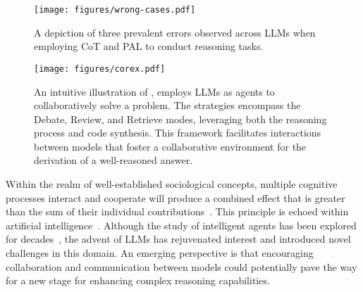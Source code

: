 \begin{figure*}[t]
  \centering
  \vspace{-0.5em}
  \texttt{[image: figures/wrong-cases.pdf]}
  \caption{A depiction of three prevalent errors observed across LLMs when employing CoT and PAL to conduct reasoning tasks.}
  \label{fig:wrong-cases}
  \vspace{-1.45em}
\end{figure*}
\begin{figure*}[t]
  \centering
  \texttt{[image: figures/corex.pdf]}
  \caption{An intuitive illustration of \ours,
  employs LLMs as agents to collaboratively solve a problem.
  The strategies encompass the Debate, Review, and Retrieve modes,
  leveraging both the reasoning process and code synthesis.
  This framework facilitates interactions between models that 
  foster a collaborative environment for the derivation of a well-reasoned answer.}
  \label{fig:method-overview}
  \vspace{-1.35em}
\end{figure*}




Within the realm of well-established sociological concepts,
multiple cognitive processes interact and cooperate will produce a combined effect that is greater than the sum of their individual contributions~\citep{luppi2022synergistic}.
This principle is echoed within artificial intelligence~\citep{li2023camel}.
Although the study of intelligent agents has been explored for decades~\citep{minsky1988society, minsky2007emotion}, 
the advent of LLMs
has rejuvenated interest and introduced novel challenges in this domain.
An emerging perspective is that encouraging collaboration and communication between models could potentially pave the way for a new stage for enhancing complex reasoning capabilities.


